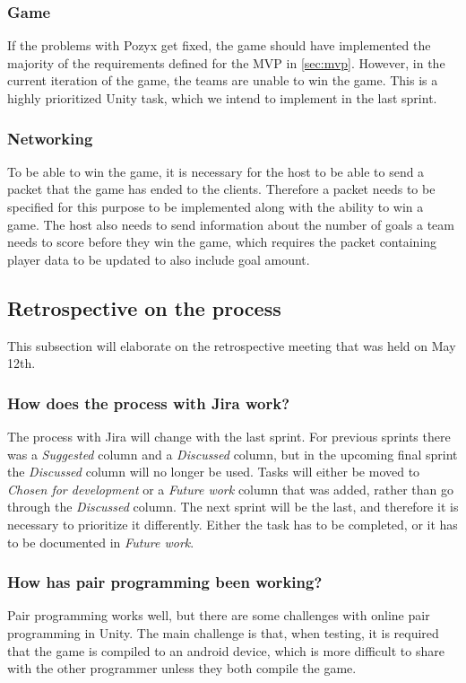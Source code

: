 \subsubsection{Game}
If the problems with Pozyx get fixed, the game should have implemented the majority of the requirements defined for the MVP in \autoref{sec:mvp}.
However, in the current iteration of the game, the teams are unable to win the game.
This is a highly prioritized Unity task, which we intend to implement in the last sprint.

\subsubsection{Networking}
To be able to win the game, it is necessary for the host to be able to send a packet that the game has ended to the clients.
Therefore a packet needs to be specified for this purpose to be implemented along with the ability to win a game.
The host also needs to send information about the number of goals a team needs to score before they win the game, which requires the packet containing player data to be updated to also include goal amount.


\subsection{Retrospective on the process}
This subsection will elaborate on the retrospective meeting that was held on May 12th.

\subsubsection*{How does the process with Jira work?}
The process with Jira will change with the last sprint.
For previous sprints there was a \textit{Suggested} column and a \textit{Discussed} column, but in the upcoming final sprint the \textit{Discussed} column will no longer be used.
Tasks will either be moved to \textit{Chosen for development} or a \textit{Future work} column that was added, rather than go through the \textit{Discussed} column.
The next sprint will be the last, and therefore it is necessary to prioritize it differently.
Either the task has to be completed, or it has to be documented in \textit{Future work}.

\subsubsection*{How has pair programming been working?}
Pair programming works well, but there are some challenges with online pair programming in Unity.
The main challenge is that, when testing, it is required that the game is compiled to an android device, which is more difficult to share with the other programmer unless they both compile the game.

